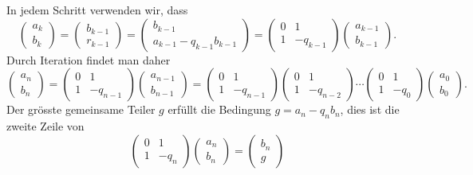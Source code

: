 In jedem Schritt verwenden wir, dass
\[
\begin{pmatrix}
a_{k}\\b_{k}
\end{pmatrix}
=
\begin{pmatrix}
b_{k-1}\\r_{k-1}
\end{pmatrix}
=
\begin{pmatrix}
b_{k-1}\\
a_{k-1}-q_{k-1}b_{k-1}
\end{pmatrix}
=
\begin{pmatrix}
0&1\\
1&-q_{k-1}
\end{pmatrix}
\begin{pmatrix}
a_{k-1}\\b_{k-1}
\end{pmatrix}.
\]
Durch Iteration findet man daher
\[
\begin{pmatrix}
a_{n}\\b_{n}
\end{pmatrix}
=
\begin{pmatrix}
0&1\\
1&-q_{n-1}
\end{pmatrix}
\begin{pmatrix}
a_{n-1}\\b_{n-1}
\end{pmatrix}
=
\begin{pmatrix}
0&1\\
1&-q_{n-1}
\end{pmatrix}
\begin{pmatrix}
0&1\\
1&-q_{n-2}
\end{pmatrix}
\cdots
\begin{pmatrix}
0&1\\
1&-q_{0}
\end{pmatrix}
\begin{pmatrix}
a_{0}\\b_{0}
\end{pmatrix}.
\]
Der grösste gemeinsame Teiler $g$  erfüllt die Bedingung $g=a_n-q_nb_n$,
dies ist die zweite Zeile von
\[
\begin{pmatrix}
0&1\\
1&-q_n
\end{pmatrix}
\begin{pmatrix}a_n\\b_n\end{pmatrix}
=
\begin{pmatrix}
b_n\\
g
\end{pmatrix}
\]
